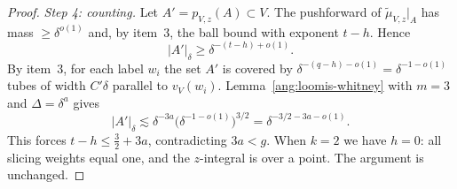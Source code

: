 \begin{proof}
\emph{Step 4: counting.} Let $A'=p_{V,z}(A)\subset V$. The pushforward of $\widetilde\mu_{V,z}|_A$ has mass $\ge\delta^{o(1)}$ and, by item~3, the ball bound with exponent $t-h$. Hence
\[
 |A'|_\delta\ge\delta^{-(t-h)+o(1)}.
\]
By item~3, for each label $w_i$ the set $A'$ is covered by $\delta^{-(q-h)-o(1)}=\delta^{-1-o(1)}$ tubes of width $C'\delta$ parallel to $v_V(w_i)$. Lemma~\ref{ang:loomis-whitney} with $m=3$ and $\Delta=\delta^a$ gives
\[
 |A'|_\delta\lesssim\delta^{-3a}\bigl(\delta^{-1-o(1)}\bigr)^{3/2}=\delta^{-3/2-3a-o(1)}.
\]
This forces $t-h\le\frac32+3a$, contradicting $3a<g$. When $k=2$ we have $h=0$: all slicing weights equal one, and the $z$-integral is over a point. The argument is unchanged.
\end{proof}
